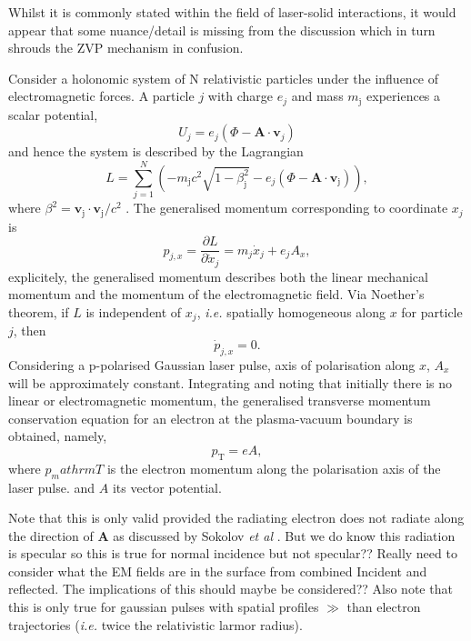 Whilst it is commonly stated within the field of laser-solid interactions, it would appear that some nuance/detail is missing from the discussion which in turn shrouds the \ac{ZVP} mechanism in confusion.

Consider a holonomic system of N relativistic particles under the influence of electromagnetic forces. A particle $j$ with charge $e_j$ and mass $m_\mathrm{j}$ experiences a scalar potential,
\begin{equation}
	U_{j} = e_j(\Phi - \mathbf{A} \cdot \mathbf{v}_{j})
\end{equation}
and hence the system is described by the Lagrangian
\begin{equation}
	L = \sum^N_{j=1}\left( - m_\mathrm{j}c^2\sqrt{1-\beta^2_\mathrm{j}} - e_j(\Phi - \mathbf{A} \cdot \mathbf{v}_\mathrm{j}) \right),
\end{equation}
where $\beta^2 = \mathbf{v}_\mathrm{j}\cdot\mathbf{v}_\mathrm{j} /c^2$ \cite{goldsteinClassicalMechanics2013}.
The generalised momentum corresponding to coordinate $x_j$ is
\begin{equation}
	p_{j,x} = \frac{\partial L}{\partial \dot{x}_j} = m_j\dot{x}_j + e_jA_x,
\end{equation}
explicitely, the generalised momentum describes both the linear mechanical momentum and the momentum of the electromagnetic field. Via Noether's theorem, if $L$ is independent of $x_j$, \textit{i.e.} spatially homogeneous along $x$ for particle $j$, then 
\begin{equation}
	\dot{p}_{j,x} = 0.
\end{equation}
Considering a p-polarised Gaussian laser pulse, axis of polarisation along $x$, $A_x$ will be approximately constant. Integrating and noting that initially there is no linear or electromagnetic momentum, the generalised transverse momentum conservation equation for an electron at the plasma-vacuum boundary is obtained, namely,
\begin{equation}
	p_\mathrm{T} = eA,
\end{equation}
where $p_mathrm{T}$ is the electron momentum along the polarisation axis of the laser pulse. and $A$ its vector potential.

Note that this is only valid provided the radiating electron does not radiate along the direction of $\mathbf{A}$ as discussed by Sokolov \textit{et al} \cite{sokolovDynamicsEmittingElectrons2009}. But we do know this radiation is specular so this is true for normal incidence but not specular?? Really need to consider what the EM fields are in the surface from combined Incident and reflected.
The implications of this should maybe be considered?? Also note that this is only true for gaussian pulses with spatial profiles $\gg$ than electron trajectories (\textit{i.e.} twice the relativistic larmor radius).


